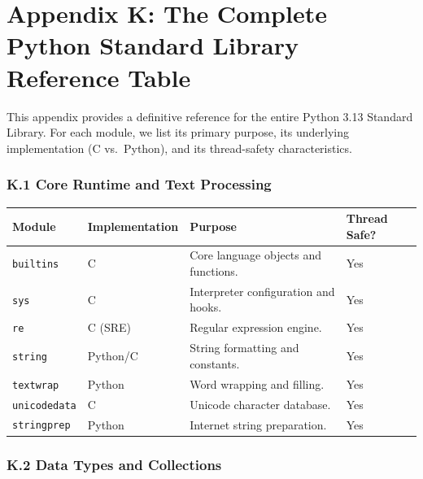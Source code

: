 \hypertarget{appendix-k-the-complete-python-standard-library-reference-table}{%
\chapter{Appendix K: The Complete Python Standard Library Reference
Table}\label{appendix-k-the-complete-python-standard-library-reference-table}}

This appendix provides a definitive reference for the entire Python 3.13
Standard Library. For each module, we list its primary purpose, its
underlying implementation (C vs.~Python), and its thread-safety
characteristics.

\hypertarget{k.1-core-runtime-and-text-processing}{%
\subsection{K.1 Core Runtime and Text
Processing}\label{k.1-core-runtime-and-text-processing}}

\begin{longtable}[]{@{}llll@{}}
\toprule
Module & Implementation & Purpose & Thread Safe? \\
\midrule
\endhead
\passthrough{\lstinline!builtins!} & C & Core language objects and
functions. & Yes \\
\passthrough{\lstinline!sys!} & C & Interpreter configuration and hooks.
& Yes \\
\passthrough{\lstinline!re!} & C (SRE) & Regular expression engine. &
Yes \\
\passthrough{\lstinline!string!} & Python/C & String formatting and
constants. & Yes \\
\passthrough{\lstinline!textwrap!} & Python & Word wrapping and filling.
& Yes \\
\passthrough{\lstinline!unicodedata!} & C & Unicode character database.
& Yes \\
\passthrough{\lstinline!stringprep!} & Python & Internet string
preparation. & Yes \\
\bottomrule
\end{longtable}

\hypertarget{k.2-data-types-and-collections}{%
\subsection{K.2 Data Types and
Collections}\label{k.2-data-types-and-collections}}

